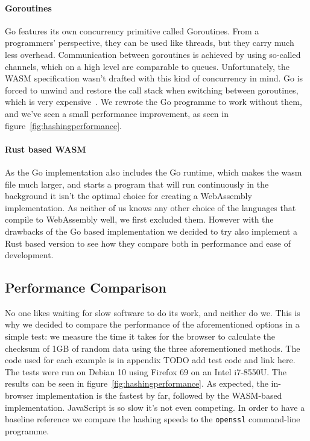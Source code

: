 \paragraph{Goroutines} Go features its own concurrency primitive called Goroutines.
From a programmers' perspective, they can be used like threads, but they carry much less overhead.
Communication between goroutines is achieved by using so-called channels, which on a high level are comparable to queues.
Unfortunately, the \gls{WASM} specification wasn't drafted with this kind of concurrency in mind.
Go is forced to unwind and restore the call stack when switching between goroutines, which is very expensive~\cite{lolnogoroutines}.
We rewrote the Go programme to work without them, and we've seen a small performance improvement, as seen in figure~\ref{fig:hashingperformance}.

\paragraph{Rust based WASM}
As the Go implementation also includes the Go runtime, which makes the wasm file much larger, and starts a program that
will run continuously in the background it isn't the optimal choice for creating a WebAssembly implementation.
As neither of us knows any other choice of the languages that compile to WebAssembly well, we first excluded them.
However with the drawbacks of the Go based implementation we decided to try also implement a Rust based version to see
how they compare both in performance and ease of development.


\subsection{Performance Comparison}
\label{subsec:perfcomphashing}
No one likes waiting for slow software to do its work, and neither do we.
This is why we decided to compare the performance of the aforementioned options in a simple test:
we measure the time it takes for the browser to calculate the checksum of 1GB of random data using the three aforementioned methods.
The code used for each example is in appendix TODO add test code and link here.
The tests were run on Debian 10 using Firefox 69 on an Intel i7-8550U.
The results can be seen in figure~\ref{fig:hashingperformance}.
As expected, the in-browser implementation is the fastest by far, followed by the \gls{WASM}-based implementation.
JavaScript is so slow it's not even competing.
In order to have a baseline reference we compare the hashing speeds to the \texttt{openssl} command-line programme.

